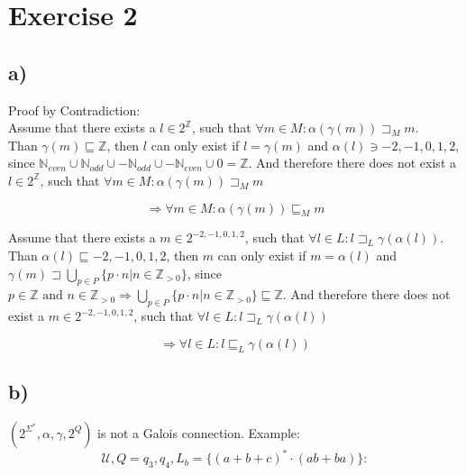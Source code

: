 \documentclass[fleqn,12pt]{article}
\begin{document}
\section*{Exercise 2}
\subsection*{a)}

Proof by Contradiction:\\
Assume that there exists a $l \in 2^{\mathbb{Z}}$, such that $\forall m \in M:\alpha(\gamma(m)) \sqsupset_M m$.\\
Than $\gamma(m) \sqsubseteq \mathbb{Z}$, then $l$ can only exist if $l=\gamma(m)$ and $\alpha(l)\ni {-2,-1,0,1,2}$, since $\mathbb{N}_{even} \cup \mathbb{N}_{odd} \cup -\mathbb{N}_{odd} \cup -\mathbb{N}_{even} \cup {0}=\mathbb{Z}$. And therefore there does not exist a $l \in 2^{\mathbb{Z}}$, such that $\forall m \in M:\alpha(\gamma(m)) \sqsupset_M m$

$$\Rightarrow \forall m \in M: \alpha(\gamma(m)) \sqsubseteq_M m$$

Assume that there exists a $m \in 2^{-2,-1,0,1,2}$, such that $\forall l \in L:l \sqsupset_L \gamma(\alpha(l))$.\\
Than $\alpha(l) \sqsubseteq {-2,-1,0,1,2}$, then $m$ can only exist if $m=\alpha(l)$ and $\gamma(m)\sqsupset \bigcup_{p \in P}\{p \cdot n | n \in \mathbb{Z}_{>0}\}$, since $p \in \mathbb{Z} \text{ and } n \in \mathbb{Z}_{>0} \Rightarrow \bigcup_{p \in P}\{p \cdot n | n \in \mathbb{Z}_{>0}\} \sqsubseteq \mathbb{Z}$. And therefore there does not exist a $m \in 2^{-2,-1,0,1,2}$, such that $\forall l \in L:l \sqsupset_L \gamma(\alpha(l))$

$$\Rightarrow \forall l \in L:l \sqsubseteq_L \gamma(\alpha(l))$$
\subsection*{b)}

$(2^{\Sigma^{*}},\alpha,\gamma,2^{Q})$ is not a Galois connection. Example:
$$\mathcal{U},Q={q_3,q_4},L_b=\{(a+b+c)^* \cdot (ab+ba)\}:$$
\end{document}
